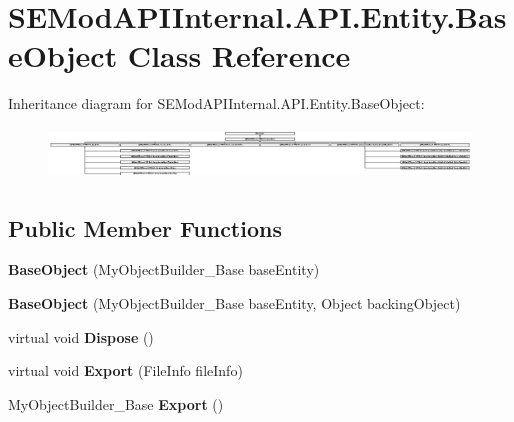 \hypertarget{class_s_e_mod_a_p_i_internal_1_1_a_p_i_1_1_entity_1_1_base_object}{}\section{S\+E\+Mod\+A\+P\+I\+Internal.\+A\+P\+I.\+Entity.\+Base\+Object Class Reference}
\label{class_s_e_mod_a_p_i_internal_1_1_a_p_i_1_1_entity_1_1_base_object}
Inheritance diagram for S\+E\+Mod\+A\+P\+I\+Internal.\+A\+P\+I.\+Entity.\+Base\+Object\+:\begin{figure}[H]
\begin{center}
\leavevmode
\includegraphics[height=1.367521cm]{class_s_e_mod_a_p_i_internal_1_1_a_p_i_1_1_entity_1_1_base_object}
\end{center}
\end{figure}
\subsection*{Public Member Functions}
\begin{DoxyCompactItemize}
\item 
\hypertarget{class_s_e_mod_a_p_i_internal_1_1_a_p_i_1_1_entity_1_1_base_object_a8ad3969abd58e82df67fe1eb4b9213af}{}{\bfseries Base\+Object} (My\+Object\+Builder\+\_\+\+Base base\+Entity)\label{class_s_e_mod_a_p_i_internal_1_1_a_p_i_1_1_entity_1_1_base_object_a8ad3969abd58e82df67fe1eb4b9213af}

\item 
\hypertarget{class_s_e_mod_a_p_i_internal_1_1_a_p_i_1_1_entity_1_1_base_object_ac0ad77911fda651b72083b3d84423cb4}{}{\bfseries Base\+Object} (My\+Object\+Builder\+\_\+\+Base base\+Entity, Object backing\+Object)\label{class_s_e_mod_a_p_i_internal_1_1_a_p_i_1_1_entity_1_1_base_object_ac0ad77911fda651b72083b3d84423cb4}

\item 
\hypertarget{class_s_e_mod_a_p_i_internal_1_1_a_p_i_1_1_entity_1_1_base_object_a6212ef74d1c75fc1451998c4cd4dffb2}{}virtual void {\bfseries Dispose} ()\label{class_s_e_mod_a_p_i_internal_1_1_a_p_i_1_1_entity_1_1_base_object_a6212ef74d1c75fc1451998c4cd4dffb2}

\item 
\hypertarget{class_s_e_mod_a_p_i_internal_1_1_a_p_i_1_1_entity_1_1_base_object_a891a4ab234dbe209b540f10fb1344955}{}virtual void {\bfseries Export} (File\+Info file\+Info)\label{class_s_e_mod_a_p_i_internal_1_1_a_p_i_1_1_entity_1_1_base_object_a891a4ab234dbe209b540f10fb1344955}

\item 
\hypertarget{class_s_e_mod_a_p_i_internal_1_1_a_p_i_1_1_entity_1_1_base_object_a038836c80cde3b631d1af33183509dba}{}My\+Object\+Builder\+\_\+\+Base {\bfseries Export} ()\label{class_s_e_mod_a_p_i_internal_1_1_a_p_i_1_1_entity_1_1_base_object_a038836c80cde3b631d1af33183509dba}

\end{DoxyCompactItemize}

